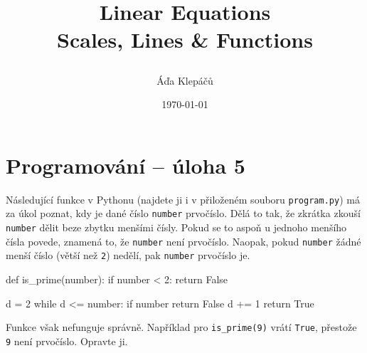 \documentclass[a4paper,12pt]{article}
\title{\Huge\textsf{Linear Equations}\\
 \Large\textsf{Scales, Lines \& Functions}
 \author{Áďa Klepáčů}
 \date{\today}
}
\begin{document}
\thispagestyle{fancy}

\section*{Programování -- úloha 5}

Následující funkce v Pythonu (najdete ji i v přiloženém souboru
\texttt{program.py}) má za úkol poznat, kdy je dané číslo \texttt{number}
prvočíslo. Dělá to tak, že zkrátka zkouší \texttt{number} dělit beze zbytku
menšími čísly. Pokud se to aspoň u jednoho menšího čísla povede, znamená to, že
\texttt{number} není prvočíslo. Naopak, pokud \texttt{number} žádné menší číslo
(větší než \texttt{2}) nedělí, pak \texttt{number} prvočíslo je.

\begin{center}
 \begin{python}
  def is_prime(number):
      if number < 2:
          return False

      d = 2
      while d <= number:
          if number %
              return False
          d += 1
          return True
 \end{python}
\end{center}

Funkce však nefunguje správně. Například pro \texttt{is\_prime(9)} vrátí
\texttt{True}, přestože \texttt{9} není prvočíslo. Opravte ji.
\end{document}
